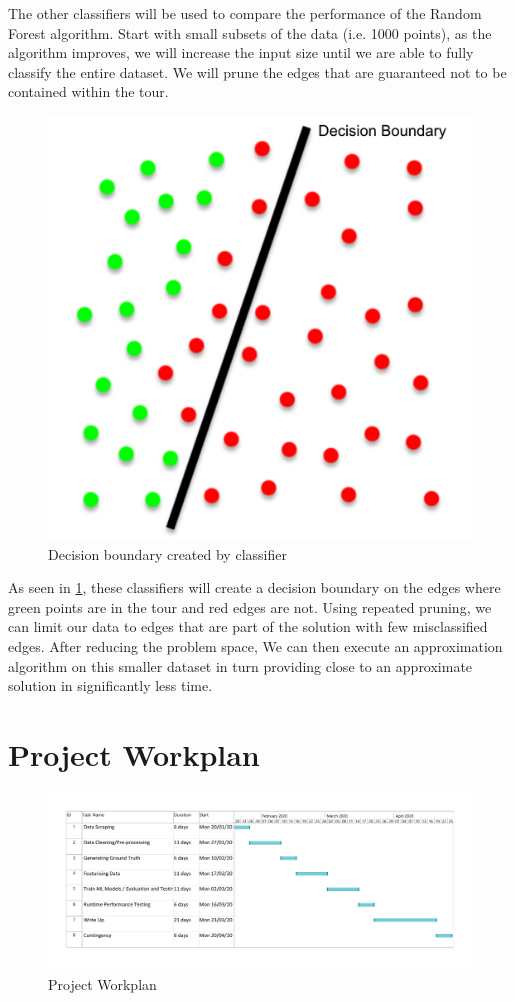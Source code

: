 \documentclass[]{UCD_CS_FYP_Report}
\begin{document}
The other classifiers will be used to compare the performance of the Random Forest algorithm.
Start with small subsets of the data (i.e. 1000 points), as the algorithm improves, we will increase the input size until we are able to fully classify the entire dataset.
We will prune\cite{iAAA} the edges that are guaranteed not to be contained within the tour. 

\newpage
\begin{figure}[h]
    \centering
  \includegraphics[width=0.5\linewidth]{Figures/Prune.pdf}
  \caption{Decision boundary created by classifier}
  \label{fig:Prune}
\end{figure}
As seen in \ref{fig:Prune}, these classifiers will create a decision boundary on the edges where green points are in the tour and red edges are not. Using repeated pruning, we can limit our data to edges that are part of the solution with few misclassified edges. After reducing the problem space, We can then execute an approximation algorithm on this smaller dataset in turn providing close to an approximate solution in significantly less time.


\chapter{Project Workplan}
\begin{figure}[h]
    \centering
  \includegraphics[width=1\linewidth]{Figures/GanttChart.pdf}
  \caption{Project Workplan}
  \label{fig:Workplan}
\end{figure}
\end{document}
